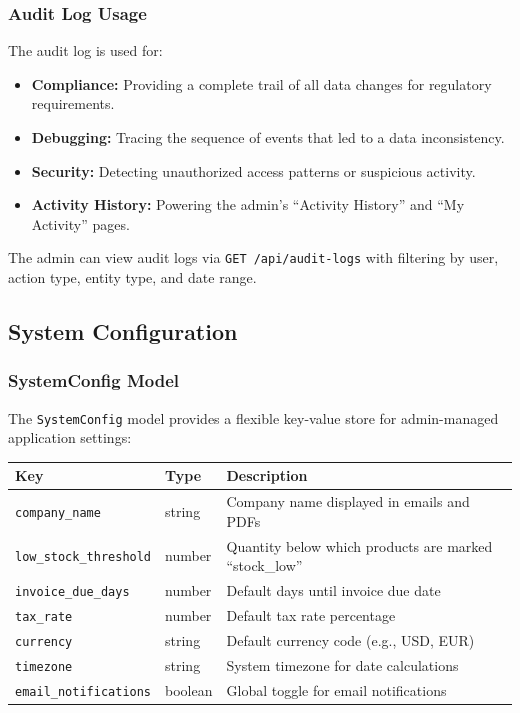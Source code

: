 \documentclass[12pt,onecolumn]{IEEEtran}
\begin{document}
\subsubsection{Audit Log Usage}

The audit log is used for:
\begin{itemize}[leftmargin=1.5em]
  \item \textbf{Compliance:} Providing a complete trail of all data changes for regulatory requirements.
  \item \textbf{Debugging:} Tracing the sequence of events that led to a data inconsistency.
  \item \textbf{Security:} Detecting unauthorized access patterns or suspicious activity.
  \item \textbf{Activity History:} Powering the admin's ``Activity History'' and ``My Activity'' pages.
\end{itemize}

The admin can view audit logs via \texttt{GET /api/audit-logs} with filtering by user, action type, entity type, and date range.

\subsection{System Configuration}

\subsubsection{SystemConfig Model}

The \texttt{SystemConfig} model provides a flexible key-value store for admin-managed application settings:

\begin{center}
\begin{tabularx}{\textwidth}{llX}
  \toprule
  \textbf{Key} & \textbf{Type} & \textbf{Description} \\
  \midrule
  \texttt{company\_name}        & string  & Company name displayed in emails and PDFs \\
  \texttt{low\_stock\_threshold} & number  & Quantity below which products are marked ``stock\_low'' \\
  \texttt{invoice\_due\_days}   & number  & Default days until invoice due date \\
  \texttt{tax\_rate}            & number  & Default tax rate percentage \\
  \texttt{currency}             & string  & Default currency code (e.g., USD, EUR) \\
  \texttt{timezone}             & string  & System timezone for date calculations \\
  \texttt{email\_notifications} & boolean & Global toggle for email notifications \\
  \bottomrule
\end{tabularx}
\end{center}
\end{document}

